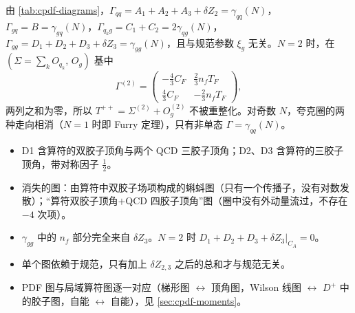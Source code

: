 \begin{theorem}[单圈反常维度]\tagR\label{thm:cpdf-anomdim}
由 \cref{tab:cpdf-diagrams}，$\Gamma_{qq}=A_1+A_2+A_3+\delta Z_2=\gamma_{qq}(N)$，$\Gamma_{gq}=B=\gamma_{gq}(N)$，$\Gamma_{q_kg}=C_1+C_2=2\gamma_{qg}(N)$，
$\Gamma_{gg}=D_1+D_2+D_3+\delta Z_3=\gamma_{gg}(N)$，且与规范参数 $\xi_g$ 无关。$N=2$ 时，在 $(\Sigma=\sum_kO_{q_k},\,O_g)$ 基中
\begin{equation}
\Gamma^{(2)}=\begin{pmatrix}-\frac43C_F&\frac23n_fT_F\\[2pt] \frac43C_F&-\frac23n_fT_F\end{pmatrix},
\end{equation}
两列之和为零，所以 $T^{++}=\Sigma^{(2)}+O_g^{(2)}$ 不被重整化。对奇数 $N$，夸克圈的两种走向相消（$N=1$ 时即 Furry 定理），只有非单态 $\Gamma=\gamma_{qq}(N)$。
\end{theorem}

\begin{remark}
\begin{itemize}[leftmargin=2em]
\item D1 含算符的双胶子顶角与两个 QCD 三胶子顶角；D2、D3 含算符的三胶子顶角，带对称因子 $\frac12$。
\item 消失的图：由算符中双胶子场项构成的蝌蚪图（只有一个传播子，没有对数发散）；“算符双胶子顶角$+$QCD 四胶子顶角”图（圈中没有外动量流过，不存在 $-4$ 次项）。
\item $\gamma_{gg}$ 中的 $n_f$ 部分完全来自 $\delta Z_3$。$N=2$ 时 $D_1+D_2+D_3+\delta Z_3|_{C_A}=0$。
\item 单个图依赖于规范，只有加上 $\delta Z_{2,3}$ 之后的总和才与规范无关。
\item PDF 图与局域算符图逐一对应（梯形图 $\leftrightarrow$ 顶角图，Wilson 线图 $\leftrightarrow$ $D^+$ 中的胶子图，自能 $\leftrightarrow$ 自能），见 \cref{sec:cpdf-moments}。
\end{itemize}
\end{remark}
